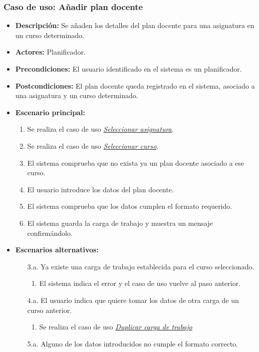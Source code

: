 \subsubsection*{Caso de uso: Añadir plan docente}
\begin{itemize}
\item{\bf Descripción:} Se añaden los detalles del plan docente para una asignatura en un curso determinado.
\item{\bf Actores:} Planificador.
\item{\bf Precondiciones:} El usuario identificado en el sistema es un planificador.
\item{\bf Postcondiciones:} El plan docente queda registrado en el sistema, asociado a una asignatura y un curso determinado.
\item{\bf Escenario principal:}
	\begin{enumerate}
	\item Se realiza el caso de uso {\em \hyperref[select_asignatura]{Seleccionar asignatura}}.
	\item Se realiza el caso de uso {\em \hyperref[select_curso]{Seleccionar curso}}.
	\item El sistema comprueba que no exista ya un plan docente asociado a ese curso.
	\item El usuario introduce los datos del plan docente.
	\item El sistema comprueba que los datos cumplen el formato requerido.
	\item El sistema guarda la carga de trabajo y muestra un mensaje confirmándolo.
	\end{enumerate}
\item{\bf Escenarios alternativos:}
	\begin{itemize}
	\item[3.a.] Ya existe una carga de trabajo establecida para el curso seleccionado.
		\begin{enumerate}
		\item El sistema indica el error y el caso de uso vuelve al paso anterior.
		\end{enumerate}
	\item[4.a.] El usuario indica que quiere tomar los datos de otra carga de un curso anterior.
		\begin{enumerate}
		\item Se realiza el caso de uso {\em \hyperref[duplicar_carga]{Duplicar carga de trabajo}}
		\end{enumerate}
	\item[5.a.] Alguno de los datos introducidos no cumple el formato correcto.

\end{itemize}
\end{itemize}

